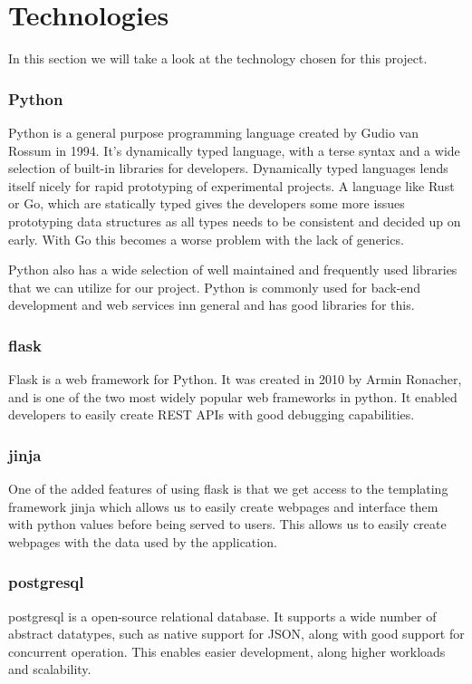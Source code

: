 \documentclass[../Main/thesis.tex]{subfiles}
\begin{document}
\chapter{Technologies}\label{ch:technologies}
In this section we will take a look at the technology chosen for this project.

\subsection*{Python}
Python is a general purpose programming language created by Gudio van Rossum in
1994. It's dynamically typed language, with a terse syntax and a wide selection
of built-in libraries for developers. Dynamically typed languages lends itself
nicely for rapid prototyping of experimental projects. A language like Rust or
Go, which are statically typed gives the developers some more issues prototyping
data structures as all types needs to be consistent and decided up on early.
With Go this becomes a worse problem with the lack of generics.

Python also has a wide selection of well maintained and frequently used
libraries that we can utilize for our project. Python is commonly used for
back-end development and web services inn general and has good libraries for
this.

\subsection*{flask}
Flask is a web framework for Python. It was created in 2010 by Armin Ronacher,
and is one of the two most widely popular web frameworks in python. It enabled
developers to easily create REST APIs with good debugging capabilities.

\subsection*{jinja}
One of the added features of using flask is that we get access to the templating
framework jinja which allows us to easily create webpages and interface them
with python values before being served to users. This allows us to easily create
webpages with the data used by the application.

\subsection*{postgresql}
postgresql is a open-source relational database. It supports a wide number of
abstract datatypes, such as native support for JSON, along with good support for
concurrent operation. This enables easier development, along higher workloads
and scalability.
\end{document}
